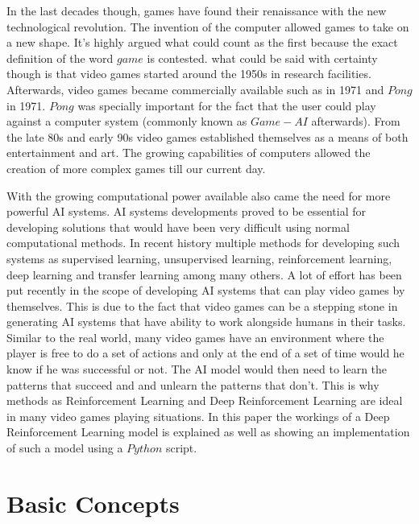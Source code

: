 \documentclass[conference]{IEEEtran}
\begin{document}
In the last decades though, games have found their renaissance with the new technological revolution. The invention of the computer allowed games to take on a new shape. It's highly argued what could count as the first  because the exact definition of the word $game$ is contested. what could be said with certainty though is that video games started around the 1950s in research facilities. Afterwards, video games became commercially available such as  in 1971 and $Pong$ in 1971. $Pong$ was specially important for the fact that the user could play against a computer system (commonly known as $Game-AI$ afterwards). From the late 80s and early 90s video games established themselves as a means of both entertainment and art. The growing capabilities of computers allowed the creation of more complex games till our current day.

With the growing computational power available also came the need for more powerful AI systems. AI systems developments proved to be essential for developing solutions that would have been very difficult using normal computational methods. In recent history multiple methods for developing such systems as supervised learning, unsupervised learning, reinforcement learning, deep learning and transfer learning among many others. A lot of effort has been put recently in the scope of developing AI systems that can play video games by themselves. This is due to the fact that video games can be a stepping stone in generating AI systems that have ability to work alongside humans in their tasks. Similar to the real world, many video games have an environment where the player is free to do a set of actions and only at the end of a set of time would he know if he was successful or not. The AI model would then need to learn the patterns that succeed and and unlearn the patterns that don't. This is why methods as Reinforcement Learning and Deep Reinforcement Learning are ideal in many video games playing situations. In this paper the workings of a Deep Reinforcement Learning model is explained as well as showing an implementation of such a model using a $Python$ script.
\section{Basic Concepts}
\end{document}
